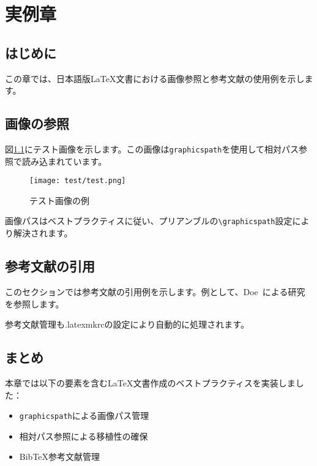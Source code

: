 \chapter{実例章}

\section{はじめに}

この章では、日本語版LaTeX文書における画像参照と参考文献の使用例を示します。

\section{画像の参照}

図\ref{fig:test_image_jp}にテスト画像を示します。この画像は\texttt{graphicspath}を使用して相対パス参照で読み込まれています。

\begin{figure}[htbp]
    \centering
    \texttt{[image: test/test.png]}
    \caption{テスト画像の例}
    \label{fig:test_image_jp}
\end{figure}

画像パスはベストプラクティスに従い、プリアンブルの\texttt{\textbackslash graphicspath}設定により解決されます。

\section{参考文献の引用}

このセクションでは参考文献の引用例を示します。例として、Doe~\cite{example}による研究を参照します。

参考文献管理も.latexmkrcの設定により自動的に処理されます。

\section{まとめ}

本章では以下の要素を含むLaTeX文書作成のベストプラクティスを実装しました：

\begin{itemize}
    \item \texttt{graphicspath}による画像パス管理
    \item 相対パス参照による移植性の確保
    \item BibTeX参考文献管理
\end{itemize}
